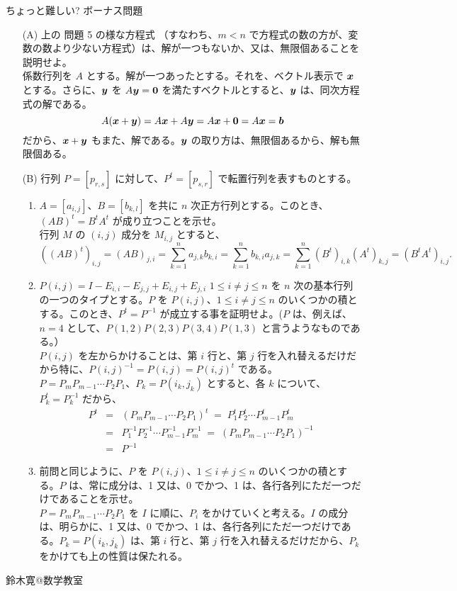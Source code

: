 \medskip
\begin{center}{\gt ちょっと難しい? ボーナス問題}\end{center}

\begin{itemize}
\item[(A)]  上の 問題 5 の様な方程式 （すなわち、$m<n$ で方程式の数の方が、変数の数より少ない方程式）は、解が一つもないか、又は、無限個あることを説明せよ。\\
\sol
係数行列を $A$ とする。解が一つあったとする。それを、ベクトル表示で $\mbox{\boldmath $x$}$ とする。さらに、$\mbox{\boldmath $y$}$ を $A\mbox{\boldmath $y$} = \mbox{\boldmath $0$}$ を満たすベクトルとすると、$\mbox{\boldmath $y$}$ は、同次方程式の解である。
$$A(\mbox{\boldmath $x$} + \mbox{\boldmath $y$}) = A\mbox{\boldmath $x$} + A\mbox{\boldmath $y$} = A\mbox{\boldmath $x$} + \mbox{\boldmath $0$} = A\mbox{\boldmath $x$} = \mbox{\boldmath $b$}$$
だから、$\mbox{\boldmath $x$} + \mbox{\boldmath $y$}$ もまた、解である。$\mbox{\boldmath $y$}$ の取り方は、無限個あるから、解も無限個ある。

\item[(B)]  行列 $P = [p_{r,s}]$ に対して、$P^t = [p_{s,r}]$ で転置行列を表すものとする。
\begin{enumerate}
\item $A = [a_{i,j}]$、$B = [b_{k,l}]$ を共に $n$ 次正方行列とする。このとき、$(AB)^t = B^tA^t$ が成り立つことを示せ。\\
\sol
行列 $M$ の $(i,j)$ 成分を $M_{i,j}$ とすると、
$$((AB)^t)_{i,j} = (AB)_{j,i} = \sum_{k=1}^n a_{j,k}b_{k,i} = 
\sum_{k=1}^n b_{k,i}a_{j,k} = \sum_{k=1}^n (B^t)_{i,k}(A^t)_{k,j} = (B^tA^t)_{i,j}.$$

\item $P(i,j) = I - E_{i,i} - E_{j,j} + E_{i,j} + E_{j,i}$ $1\leq i\neq j\leq n$ を $n$ 次の基本行列の一つのタイプとする。$P$ を $P(i,j)$、$1\leq i\neq j\leq n$  のいくつかの積とする。このとき、$P^t = P^{-1}$ が成立する事を証明せよ。($P$ は、例えば、$n = 4$ として、$P(1,2)P(2,3)P(3,4)P(1,3)$ と言うようなものである。）\\
\sol
$P(i,j)$ を左からかけることは、第 $i$ 行と、第 $j$ 行を入れ替えるだけだから特に、$P(i,j)^{-1} = P(i,j) = P(i,j)^{t}$ である。$P = P_mP_{m-1}\cdots P_2P_1$、$P_k = P(i_k,j_k)$ とすると、各 $k$ について、$P^t_{k} = P^{-1}_k$ だから、
\begin{eqnarray*}
P^t & = & (P_mP_{m-1}\cdots P_2P_1)^t\; = \; P_1^tP_2^t\cdots P_{m-1}^tP_m^t\\
& = & P_1^{-1}P_2^{-1}\cdots P_{m-1}^{-1}P_m^{-1}\; =  \;(P_mP_{m-1}\cdots P_2P_1)^{-1}\\
& = & P^{-1}
\end{eqnarray*}

\item 前問と同じように、$P$ を $P(i,j)$、$1\leq i\neq j\leq n$  のいくつかの積とする。$P$ は、常に成分は、1 又は、0 でかつ、1 は、各行各列にただ一つだけであることを示せ。\\
\sol
$P = P_mP_{m-1}\cdots P_2P_1$ を $I$ に順に、$P_i$ をかけていくと考える。$I$ の成分は、明らかに、1 又は、0 でかつ、1 は、各行各列にただ一つだけである。$P_k = P(i_k,j_k)$ は、第 $i$ 行と、第 $j$ 行を入れ替えるだけだから、$P_k$ をかけても上の性質は保たれる。

\end{enumerate}
\end{itemize}

\begin{flushright}
鈴木寛@数学教室
\end{flushright}

